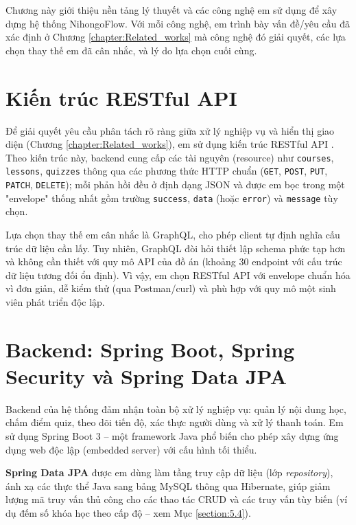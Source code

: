 \documentclass[../DoAn.tex]{subfiles}
\begin{document}
Chương này giới thiệu nền tảng lý thuyết và các công nghệ em sử dụng để xây dựng hệ thống NihongoFlow. Với mỗi công nghệ, em trình bày vấn đề/yêu cầu đã xác định ở Chương \ref{chapter:Related_works} mà công nghệ đó giải quyết, các lựa chọn thay thế em đã cân nhắc, và lý do lựa chọn cuối cùng.

\section{Kiến trúc RESTful API}
\label{section:3.1}

Để giải quyết yêu cầu phân tách rõ ràng giữa xử lý nghiệp vụ và hiển thị giao diện (Chương \ref{chapter:Related_works}), em sử dụng kiến trúc RESTful API \cite{fielding2000rest}. Theo kiến trúc này, backend cung cấp các tài nguyên (resource) như \texttt{courses}, \texttt{lessons}, \texttt{quizzes} thông qua các phương thức HTTP chuẩn (\texttt{GET}, \texttt{POST}, \texttt{PUT}, \texttt{PATCH}, \texttt{DELETE}); mỗi phản hồi đều ở định dạng JSON và được em bọc trong một "envelope" thống nhất gồm trường \texttt{success}, \texttt{data} (hoặc \texttt{error}) và \texttt{message} tùy chọn.

Lựa chọn thay thế em cân nhắc là GraphQL, cho phép client tự định nghĩa cấu trúc dữ liệu cần lấy. Tuy nhiên, GraphQL đòi hỏi thiết lập schema phức tạp hơn và không cần thiết với quy mô API của đồ án (khoảng 30 endpoint với cấu trúc dữ liệu tương đối ổn định). Vì vậy, em chọn RESTful API với envelope chuẩn hóa vì đơn giản, dễ kiểm thử (qua Postman/curl) và phù hợp với quy mô một sinh viên phát triển độc lập.

\section{Backend: Spring Boot, Spring Security và Spring Data JPA}
\label{section:3.2}

Backend của hệ thống đảm nhận toàn bộ xử lý nghiệp vụ: quản lý nội dung học, chấm điểm quiz, theo dõi tiến độ, xác thực người dùng và xử lý thanh toán. Em sử dụng Spring Boot 3 \cite{springboot} -- một framework Java phổ biến cho phép xây dựng ứng dụng web độc lập (embedded server) với cấu hình tối thiểu.

\textbf{Spring Data JPA} được em dùng làm tầng truy cập dữ liệu (lớp \textit{repository}), ánh xạ các thực thể Java sang bảng MySQL thông qua Hibernate, giúp giảm lượng mã truy vấn thủ công cho các thao tác CRUD và các truy vấn tùy biến (ví dụ đếm số khóa học theo cấp độ -- xem Mục \ref{section:5.4}).
\end{document}
